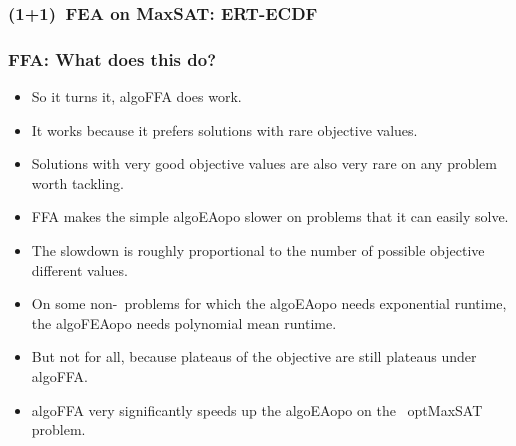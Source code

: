 \documentclass[aspectratio=169,mathserif,notheorems]{beamer}%
\begin{document}
%
\begin{frame}%
\frametitle{(1+1)~FEA on MaxSAT: ERT-ECDF}%
%
%
%
\end{frame}%
%
\begin{frame}%
\frametitle{FFA: What does this do?}%
%
\begin{itemize}%
\item So it turns it, \gls{algoFFA} does work.%
\item<2-> It works because it prefers solutions with rare objective values.%
\item<3-> Solutions with very good objective values are also very rare on any problem worth tackling.%
\item<4-> FFA makes the simple \gls{algoEAopo} slower on problems that it can easily solve.%
\item<5-> The slowdown is roughly proportional to the number of possible objective different values.%
\item<6-> On some non-\npHard\ problems for which the \gls{algoEAopo} needs \alert{exponential} runtime, the \gls{algoFEAopo} needs \alert{polynomial} mean runtime.%
\item<7-> But not for all, because plateaus of the objective are still plateaus under \gls{algoFFA}.%
\item<8-> \gls{algoFFA} very significantly speeds up the \gls{algoEAopo} on the \npComplete\ \gls{optMaxSAT} problem.%
\end{itemize}%
%
\end{frame}%
%
\end{document}
